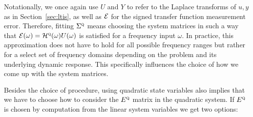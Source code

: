 Notationally, we once again use $U$ and $Y$ to refer to the Laplace transforms of $u, y$ as in Section~\ref{sec:ltis}, as well as $\mathcal{E}$ for the signed transfer function measurement error.
Therefore, fitting $\Sigma^{\textnormal{\scshape q}}$ means choosing the system matrices in such a way that $\mathcal{E}(\omega) = \mathcal{H}^{\textnormal{\scshape q}}(\omega) U(\omega)$ is satisfied for a frequency input $\omega$.
In practice, this approximation does not have to hold for all possible frequency ranges but rather for a select set of frequency domains depending on the problem and its underlying dynamic response.
This specifically influences the choice of how we come up with the system matrices.

Besides the choice of procedure, using quadratic state variables also implies that we have to choose how to consider the $E^{\textnormal{\scshape q}}$ matrix in the quadratic system.
If $E^{\textnormal{\scshape q}}$ is chosen by computation from the linear system variables we get two options:

